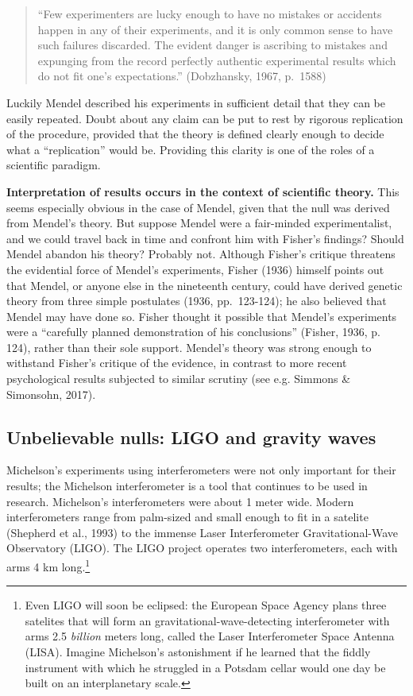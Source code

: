 \documentclass[english,floatsintext,man]{apa6}
\theoremstyle{definition}
\theoremstyle{definition}
\theoremstyle{definition}
\theoremstyle{remark}
\begin{document}
\begin{quote}
\enquote{Few experimenters are lucky enough to have no mistakes or
accidents happen in any of their experiments, and it is only common
sense to have such failures discarded. The evident danger is ascribing
to mistakes and expunging from the record perfectly authentic
experimental results which do not fit one's expectations.} (Dobzhansky,
1967, p.~1588)
\end{quote}

Luckily Mendel described his experiments in sufficient detail that they
can be easily repeated. Doubt about any claim can be put to rest by
rigorous replication of the procedure, provided that the theory is
defined clearly enough to decide what a \enquote{replication} would be.
Providing this clarity is one of the roles of a scientific paradigm.

\textbf{Interpretation of results occurs in the context of scientific
theory.} This seems especially obvious in the case of Mendel, given that
the null was derived from Mendel's theory. But suppose Mendel were a
fair-minded experimentalist, and we could travel back in time and
confront him with Fisher's findings? Should Mendel abandon his theory?
Probably not. Although Fisher's critique threatens the evidential force
of Mendel's experiments, Fisher (1936) himself points out that Mendel,
or anyone else in the nineteenth century, could have derived genetic
theory from three simple postulates (1936, pp.~123-124); he also
believed that Mendel may have done so. Fisher thought it possible that
Mendel's experiments were a \enquote{carefully planned demonstration of
his conclusions} (Fisher, 1936, p. 124), rather than their sole support.
Mendel's theory was strong enough to withstand Fisher's critique of the
evidence, in contrast to more recent psychological results subjected to
similar scrutiny (see e.g. Simmons \& Simonsohn, 2017).

\hypertarget{unbelievable-nulls-ligo-and-gravity-waves}{%
\subsection{Unbelievable nulls: LIGO and gravity
waves}\label{unbelievable-nulls-ligo-and-gravity-waves}}

Michelson's experiments using interferometers were not only important
for their results; the Michelson interferometer is a tool that continues
to be used in research. Michelson's interferometers were about 1 meter
wide. Modern interferometers range from palm-sized and small enough to
fit in a satelite (Shepherd et al., 1993) to the immense Laser
Interferometer Gravitational-Wave Observatory (LIGO). The LIGO project
operates two interferometers, each with arms 4 km long.\footnote{Even
  LIGO will soon be eclipsed: the European Space Agency plans three
  satelites that will form an gravitational-wave-detecting
  interferometer with arms 2.5 \emph{billion} meters long, called the
  Laser Interferometer Space Antenna (LISA). Imagine Michelson's
  astonishment if he learned that the fiddly instrument with which he
  struggled in a Potsdam cellar would one day be built on an
  interplanetary scale.}
\end{document}
